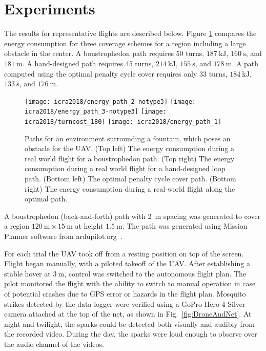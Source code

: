 \section[Experiments]{Experiments}

The results for representative flights are described below. Figure \ref{fig:fountain} compares the energy consumption for three coverage schemes for a region including a large obstacle in the center.  
A boustrophedon path requires 50 turns, $\SI{187}{\kilo\joule}$, $\SI{160}{\second}$, and $\SI{181}{\metre}$.
A hand-designed path requires 45 turns, $\SI{214}{\kilo\joule}$, $\SI{155}{\second}$, and $\SI{178}{\metre}$.
A path computed using the optimal penalty cycle cover requires only 33 turns, $\SI{184}{\kilo\joule}$, $\SI{133}{\second}$, and $\SI{176}{\metre}$.

\begin{figure}[h]
	\begin{center}
	\texttt{[image: icra2018/energy\_path\_2-notype3]}
	\texttt{[image: icra2018/energy\_path\_3-notype3]}
	\texttt{[image: icra2018/turncost\_180]}
	\texttt{[image: icra2018/energy\_path\_1]}
	\caption[Fountain]{Paths for an environment surrounding a fountain, which poses an obstacle for the UAV. 
	(Top left) The energy consumption during a real world flight for a boustrophedon path.
	(Top right) The energy consumption during a real world flight for a hand-designed loop path.
	(Bottom left) The optimal penalty cycle cover path.
	(Bottom right) The energy consumption during a real-world flight along the optimal path.} \label{fig:fountain}
	\end{center}
	\vspace{-1em}
\end{figure}


A boustrophedon (back-and-forth) path with \SI{2}{\metre} spacing was generated to cover a region $\SI{120}{\metre} \times \SI{15}{\metre}$ at height $\SI{1.5}{\metre}$.
The path was generated using Mission Planner software from ardupilot.org~\cite{Ardupilot}.

For each trial the UAV took off from a resting position on top of the screen.
Flight began manually, with a piloted takeoff of the UAV. After establishing a stable hover at $\SI{3}{\metre}$, control was switched to the autonomous flight plan.
The pilot monitored the flight with the ability to switch to manual operation in case of potential crashes due to GPS error or hazards in the flight plan.
Mosquito strikes detected by the data logger were verified using a GoPro Hero 4 Silver camera attached at the top of the net, as shown in Fig.~\ref{fig:DroneAndNet}.
At night and twilight, the sparks could be detected both visually and audibly from the recorded video.
During the day, the sparks were loud enough to observe over the audio channel of the videos.

